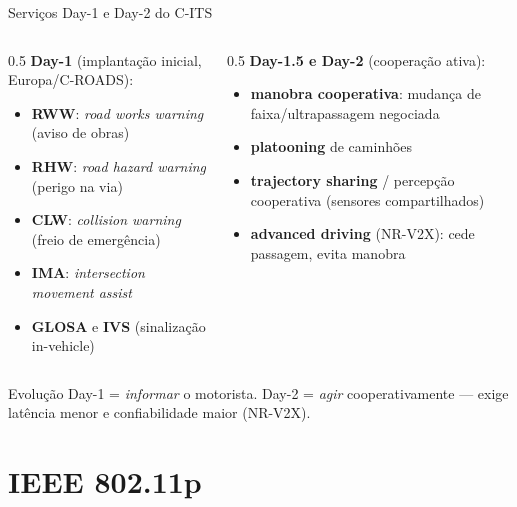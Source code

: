 \documentclass[aspectratio=169,11pt]{beamer}
\begin{document}
\begin{frame}{Serviços Day-1 e Day-2 do C-ITS}
  \begin{columns}
    \begin{column}{0.5\textwidth}
      \textbf{Day-1} (implantação inicial, Europa/C-ROADS):
      \begin{itemize}
        \item \textbf{RWW}: \emph{road works warning} (aviso de obras)
        \item \textbf{RHW}: \emph{road hazard warning} (perigo na via)
        \item \textbf{CLW}: \emph{collision warning} (freio de emergência)
        \item \textbf{IMA}: \emph{intersection movement assist}
        \item \textbf{GLOSA} e \textbf{IVS} (sinalização in-vehicle)
      \end{itemize}
    \end{column}
    \begin{column}{0.5\textwidth}
      \textbf{Day-1.5 e Day-2} (cooperação ativa):
      \begin{itemize}
        \item \textbf{manobra cooperativa}: mudança de faixa/ultrapassagem negociada
        \item \textbf{platooning} de caminhões
        \item \textbf{trajectory sharing} / percepção cooperativa (sensores compartilhados)
        \item \textbf{advanced driving} (NR-V2X): cede passagem, evita manobra
      \end{itemize}
    \end{column}
  \end{columns}
  \begin{exampleblock}{Evolução}
    Day-1 = \emph{informar} o motorista. Day-2 = \emph{agir} cooperativamente --- exige latência menor e confiabilidade maior (NR-V2X).
  \end{exampleblock}
\end{frame}

\section{IEEE 802.11p}
\end{document}
